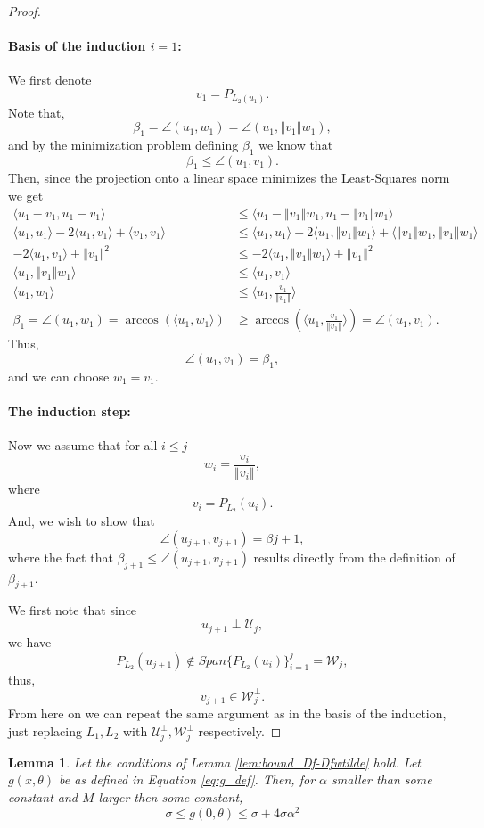 \documentclass[12pt]{article}
\newtheorem{Lemma}[Theorem]{Lemma}
\theoremstyle{remark}
\newcommand{\UU}{\mathcal{U}}
\newcommand{\WW}{\mathcal{W}}
\newcommand{\norm}[1]{\left\Vert #1 \right\Vert}
\newcommand{\lrangle}[1]{\langle #1 \rangle}
\begin{document}
\begin{appendices}
\begin{proof}
	\paragraph*{Basis of the induction $ i=1 $:}
	We first denote
	\[
	v_1 = P_{L_2(u_1)}
	.\]
	Note that,
	\[
	\beta_1 = \angle(u_1, w_1) = \angle(u_1, \norm{v_1} w_1 )
	,\]
	and by the minimization problem defining $ \beta_1 $ we know that
	\[
	\beta_1 \leq \angle(u_1, v_1)
	.\]
	Then, since the projection onto a linear space minimizes the Least-Squares norm we get
	\begin{align*}
	\lrangle{u_1 - v_1, u_1 - v_1} 
	&\leq 
	\lrangle{u_1 - \norm{v_1}w_1, u_1 - \norm{v_1}w_1}\\
	\lrangle{u_1,u_1} - 2\lrangle{u_1, v_1} + \lrangle{v_1,v_1} 
	&\leq
	 \lrangle{u_1,u_1} - 2\lrangle{u_1, \norm{v_1}w_1} + \lrangle{\norm{v_1}w_1,\norm{v_1}w_1} \\
	 - 2\lrangle{u_1, v_1} + \norm{v_1}^2 
	 &\leq
	 - 2\lrangle{u_1, \norm{v_1}w_1} + \norm{v_1}^2 \\
	 \lrangle{u_1, \norm{v_1}w_1} 
	 &\leq
	 \lrangle{u_1, v_1}\\
	 \lrangle{u_1, w_1} 
	 &\leq
	 \lrangle{u_1, \frac{v_1}{\norm{v_1}}}
	 \\
	 \beta_1 =
	 \angle(u_1, w_1) =
	 \arccos(\lrangle{u_1, w_1}) 
	 &\geq
	 \arccos(\lrangle{u_1, \frac{v_1}{\norm{v_1}}}) = \angle(u_1, v_1)
	.\end{align*}
	Thus, 
	\[
	\angle(u_1, v_1) = \beta_1
	,\]
	and we can choose $ w_1 = v_1 $.
	\paragraph*{The induction step:}
	Now we assume that for all $ i\leq j $
	\[
	w_i = \frac{v_i}{\norm{v_i}}
	,\]
	where
	\[
	v_i = P_{L_2}(u_i)
	.\]
	And, we wish to show that 
	\[
	\angle(u_{j+1}, v_{j+1}) = \beta{j+1}
	,\]
	where the fact that $ \beta_{j+1} \leq  \angle(u_{j+1}, v_{j+1})$ results directly from the definition of $ \beta_{j+1} $.
	
	We first note that since
	\[
	u_{j+1}\perp\UU_j
	,\]
	we have
	\[	P_{L_2}(u_{j+1})\notin Span\{P_{L_2}(u_i)\}_{i=1}^j = \WW_j
	,\]
	thus, 
	\[
	v_{j+1} \in \WW_j^\perp  
	.\]
	From here on we can repeat the same argument as in the basis of the induction, just replacing $ L_1, L_2 $ with $ \UU_j^\perp, \WW_j^\perp $ respectively.
\end{proof}


\begin{Lemma}\label{lem:g_bond_weak}
Let the conditions of Lemma \ref{lem:bound_Df-Dfwtilde} hold.
Let $g(x, \theta)$ be as defined in Equation \eqref{eq:g_def}.
Then, for $\alpha$ smaller than some constant and $M$ larger then some constant, 
\[
\sigma \leq g(0,\theta) \leq \sigma +  4\sigma \alpha^2
\]
\end{Lemma}


\end{appendices}
\end{document}
